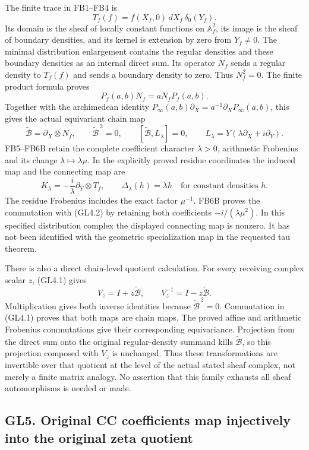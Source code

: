 The finite trace in FB1--FB4 is \[
T_f(f)=f(X_f,0)\,dX_f\,\delta_0(Y_f).
\] Its domain is the sheaf of locally constant functions on
\(\mathbb A_f^2\), its image is the sheaf of boundary densities, and its
kernel is extension by zero from \(Y_f\ne0\). The minimal distribution
enlargement contains the regular densities and these boundary densities
as an internal direct sum. Its operator \(N_f\) sends a regular density
to \(T_f(f)\) and sends a boundary density to zero. Thus \(N_f^2=0\).
The finite product formula proves \[
P_f(a,b)N_f=aN_fP_f(a,b).
\] Together with the archimedean identity
\(P_\infty(a,b)\partial_X=a^{-1}\partial_XP_\infty(a,b)\), this gives
the actual equivariant chain map \[
\widetilde{\mathcal B}=\partial_X\otimes N_f,
\qquad \widetilde{\mathcal B}^{\,2}=0,
\qquad [\widetilde{\mathcal B},L_\lambda]=0,
\qquad L_\lambda=Y(\lambda\partial_X+i\partial_Y).
\tag{GL4.1}
\] FB5--FB6B retain the complete coefficient character \(\lambda>0\),
arithmetic Frobenius and its change \(\lambda\mapsto\lambda\mu\). In the
explicitly proved residue coordinates the induced map and the connecting
map are \[
K_\lambda=-\frac{i}{\lambda}\partial_Y\otimes T_f,
\qquad \Delta_\lambda(h)=\lambda h
\quad\text{for constant densities }h.
\tag{GL4.2}
\] The residue Frobenius includes the exact factor \(\mu^{-1}\). FB6B
proves the commutation with (GL4.2) by retaining both coefficients
\(-i/(\lambda\mu^2)\). In this specified distribution complex the
displayed connecting map is nonzero. It has not been identified with the
geometric specialization map in the requested tau theorem.

There is also a direct chain-level quotient calculation. For every
receiving complex scalar \(z\), (GL4.1) gives \[
V_z=I+z\widetilde{\mathcal B},\qquad
V_z^{-1}=I-z\widetilde{\mathcal B}.
\tag{GL4.3}
\] Multiplication gives both inverse identities because
\(\widetilde{\mathcal B}^{\,2}=0\). Commutation in (GL4.1) proves that
both maps are chain maps. The proved affine and arithmetic Frobenius
commutations give their corresponding equivariance. Projection from the
direct sum onto the original regular-density summand kills
\(\widetilde{\mathcal B}\), so this projection composed with \(V_z\) is
unchanged. Thus these transformations are invertible over that quotient
at the level of the actual stated sheaf complex, not merely a finite
matrix analogy. No assertion that this family exhausts all sheaf
automorphisms is needed or made.

\subsection{GL5. Original CC coefficients map injectively into the
original zeta
quotient}\label{gl5.-original-cc-coefficients-map-injectively-into-the-original-zeta-quotient}

